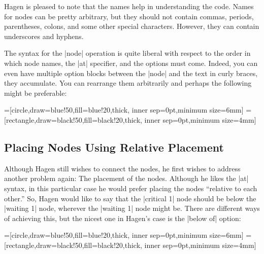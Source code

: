 Hagen is pleased to note that the names help in understanding the
code. Names for nodes can be pretty arbitrary, but they should not
contain commas, periods, parentheses, colons, and some other special
characters. However, they can contain underscores and hyphens. 

The syntax for the |node| operation is quite liberal with respect to
the order in which node names, the |at| specifier, and the options
must come. Indeed, you can even have multiple option blocks between
the |node| and the text in curly braces, they accumulate. You can
rearrange them arbitrarily and perhaps the following might be preferable:

{
=[circle,draw=blue!50,fill=blue!20,thick,
                   inner sep=0pt,minimum size=6mm]
=[rectangle,draw=black!50,fill=black!20,thick,
                        inner sep=0pt,minimum size=4mm]
\begin{codeexample}[]
\end{codeexample}
}



\subsection{Placing Nodes Using Relative Placement}

Although Hagen still wishes to connect the nodes, he first wishes to
address another problem again: The placement of the nodes. Although he
likes the |at| syntax, in this particular case he would prefer placing
the nodes ``relative to each other.'' So, Hagen would like to say that
the |critical 1| node should be below the |waiting 1| node, wherever
the |waiting 1| node might be. There are different ways of achieving
this, but the nicest one in Hagen's case is the |below of| option:

{
=[circle,draw=blue!50,fill=blue!20,thick,
                   inner sep=0pt,minimum size=6mm]
=[rectangle,draw=black!50,fill=black!20,thick,
                        inner sep=0pt,minimum size=4mm]
\begin{codeexample}[]
\end{codeexample}
}

